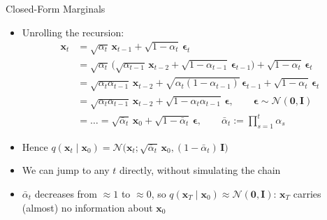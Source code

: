 \documentclass[11pt,compress,t,notes=noshow, xcolor=table]{beamer}
\providecommand{\bx}{\mathbf{x}}
\begin{document}
\begin{frame}{Closed-Form Marginals}
 
\vfill
 
\begin{itemize}
\item Unrolling the recursion:
\begin{align*}
\bx_t &= \sqrt{\alpha_t}\, \bx_{t-1} + \sqrt{1 - \alpha_t}\, \boldsymbol{\epsilon}_t\\
&= \sqrt{\alpha_t} \, \big( \sqrt{\alpha_{t-1}}\, \bx_{t-2} + \sqrt{1 - \alpha_{t-1}}  \, \boldsymbol{\epsilon}_{t-1}\big)  + \sqrt{1 - \alpha_t}\, \boldsymbol{\epsilon}_t\\
&= \sqrt{\alpha_t \alpha_{t-1}}\, \bx_{t-2} + \sqrt{\alpha_t (1 - \alpha_{t-1})}\, \boldsymbol{\epsilon}_{t-1} + \sqrt{1 - \alpha_t}\, \boldsymbol{\epsilon}_t\\
&= \sqrt{\alpha_t \alpha_{t-1}}\, \bx_{t-2} + \sqrt{1 - \alpha_t \alpha_{t-1}}\, \boldsymbol{\epsilon}, \qquad \boldsymbol{\epsilon} \sim \mathcal{N}(\mathbf{0}, \mathbf{I})\\
&= \dots = \sqrt{\bar{\alpha}_t}\, \bx_0 + \sqrt{1 - \bar{\alpha}_t}\, \boldsymbol{\epsilon}, \qquad \bar{\alpha}_t := \prod_{s=1}^{t} \alpha_s
\end{align*}
\item \vspace{-5pt}Hence $q(\bx_t \mid \bx_0) = \mathcal{N}\big(\bx_t; \sqrt{\bar{\alpha}_t}\, \bx_0, (1 - \bar{\alpha}_t)\, \mathbf{I}\big)$
\item We can jump to any $t$ directly, without simulating the chain
\item $\bar{\alpha}_t$ decreases from $\approx 1$ to $\approx 0$, so $q(\bx_T \mid \bx_0) \approx \mathcal{N}(\mathbf{0}, \mathbf{I})$: $\bx_T$ carries (almost) no information about $\bx_0$
\end{itemize}
 
\vfill
 
\end{frame}
\end{document}
